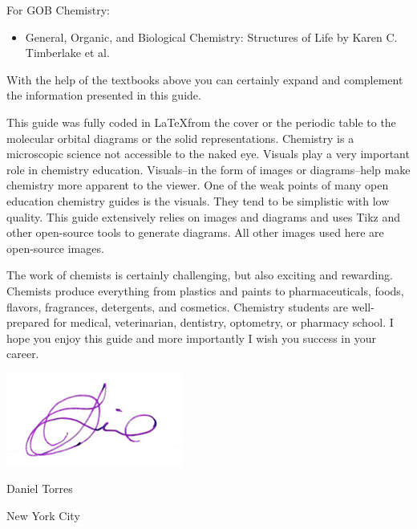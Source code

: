 \documentclass[main.tex]{subfiles}
\begin{document}
\begin{fullwidth}
\begin{multicols*}{2}
For GOB Chemistry:
\begin{small}\begin{itemize}[label=]
\setlength\itemsep{0.5em}\item General, Organic, and Biological Chemistry: Structures of Life by Karen C. Timberlake et al.
\end{itemize}\end{small}



With the help of the textbooks above you can certainly expand and complement the information presented in this guide.

This guide was fully coded in \LaTeX from the cover or the periodic table to the molecular orbital diagrams or the solid representations. Chemistry is a microscopic science not accessible to the naked eye. Visuals play a very important role in chemistry education. Visuals--in the form of images or diagrams--help make chemistry more apparent to the viewer. One of the weak points of many open education chemistry guides is the visuals. They tend to be simplistic with low quality. This guide extensively relies on images and diagrams and uses Tikz and other open-source tools to generate diagrams. All other images used here are open-source images.

The work of chemists is certainly challenging, but also exciting and rewarding. Chemists produce everything from plastics and paints to pharmaceuticals, foods, flavors, fragrances, detergents, and cosmetics. Chemistry students are well-prepared for medical, veterinarian, dentistry, optometry, or pharmacy school. I hope you enjoy this guide and more importantly I wish you success in your career.  
\par \medskip
\includegraphics[height=4.5\baselineskip,]{./tothereader/signature} \par
Daniel Torres \par
New York City
\end{multicols*}
\end{fullwidth}
\restoregeometry
\end{document}
